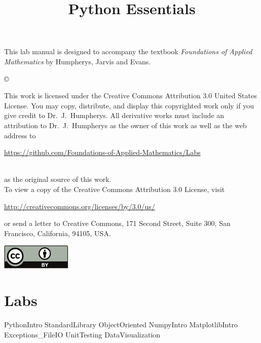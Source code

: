 \documentclass[opener-c,labs,blue,nociteref]{HJnewsiambook}
\title{Python Essentials}
\begin{document}

\thispagestyle{empty} %
\maketitle
\thispagestyle{empty}
\frontmatter



\begin{thepreface} %

This lab manual is designed to accompany the textbook \emph{Foundations of Applied Mathematics} by Humpherys, Jarvis and Evans.

\vfill
\copyright{This work is licensed under the Creative Commons Attribution 3.0 United States
License.  You may copy, distribute, and display this copyrighted work only if you give
credit to Dr.~J.~Humpherys. All derivative works must include an attribution to Dr.~J.~Humpherys as the owner of this work as well as the web address to
\\\centerline{\url{https://github.com/Foundations-of-Applied-Mathematics/Labs}}\\as the original source of this work.
\\To view a copy of the Creative Commons Attribution 3.0 License, visit
\\\centerline{\url{http://creativecommons.org/licenses/by/3.0/us/}} or send a letter to Creative Commons, 171 Second Street, Suite 300, San Francisco, California, 94105, USA.}

\vfill
\centering\includegraphics[height=1.2cm]{by.pdf}
\vfill
\end{thepreface}

\setcounter{tocdepth}{1}
\tableofcontents

\mainmatter %

\part{Labs}
{PythonIntro}
{StandardLibrary}
{ObjectOriented}
{NumpyIntro}
{MatplotlibIntro}
{Exceptions_FileIO}
{UnitTesting}
{DataVisualization}
\end{document}
